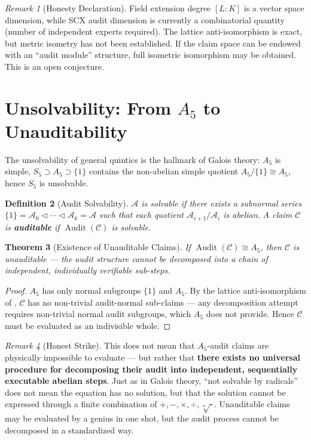 \documentclass[10pt,a4paper]{article}
\newtheorem{theorem}{Theorem}[section]
\newtheorem{definition}[theorem]{Definition}
\theoremstyle{remark}
\newtheorem{remark}[theorem]{Remark}
\DeclareMathOperator{\Audit}{Audit}
\newcommand{\A}{\mathcal{A}}
\newcommand{\cC}{\mathcal{C}}
\begin{document}
\begin{remark}[Honesty Declaration]
Field extension degree $[L:K]$ is a vector space dimension, while SCX audit dimension is currently a combinatorial quantity (number of independent experts required). The lattice anti-isomorphism is exact, but metric isometry has not been established. If the claim space can be endowed with an ``audit module'' structure, full isometric isomorphism may be obtained. This is an open conjecture.
\end{remark}

\section{Unsolvability: From $A_5$ to Unauditability}

The unsolvability of general quintics is the hallmark of Galois theory: $A_5$ is simple, $S_5\supset A_5\supset\{1\}$ contains the non-abelian simple quotient $A_5/\{1\}\cong A_5$, hence $S_5$ is unsolvable.

\begin{definition}[Audit Solvability]
$\A$ is solvable if there exists a subnormal series $\{1\}=\A_0\triangleleft\cdots\triangleleft\A_k=\A$ such that each quotient $\A_{i+1}/\A_i$ is abelian. A claim $\cC$ is \textbf{auditable} if $\Audit(\cC)$ is solvable.
\end{definition}

\begin{theorem}[Existence of Unauditable Claims]\label{thm:unauditable}
If $\Audit(\cC)\cong A_5$, then $\cC$ is unauditable — the audit structure cannot be decomposed into a chain of independent, individually verifiable sub-steps.
\end{theorem}

\begin{proof}
$A_5$ has only normal subgroups $\{1\}$ and $A_5$. By the lattice anti-isomorphism of , $\cC$ has no non-trivial audit-normal sub-claims — any decomposition attempt requires non-trivial normal audit subgroups, which $A_5$ does not provide. Hence $\cC$ must be evaluated as an indivisible whole.
\end{proof}

\begin{remark}[Honest Strike]
This does not mean that $A_5$-audit claims are physically impossible to evaluate — but rather that \textbf{there exists no universal procedure for decomposing their audit into independent, sequentially executable abelian steps}. Just as in Galois theory, ``not solvable by radicals'' does not mean the equation has no solution, but that the solution cannot be expressed through a finite combination of $+,-,\times,\div,\sqrt[n]{\cdot}$. Unauditable claims may be evaluated by a genius in one shot, but the audit process cannot be decomposed in a standardized way.
\end{remark}
\end{document}
